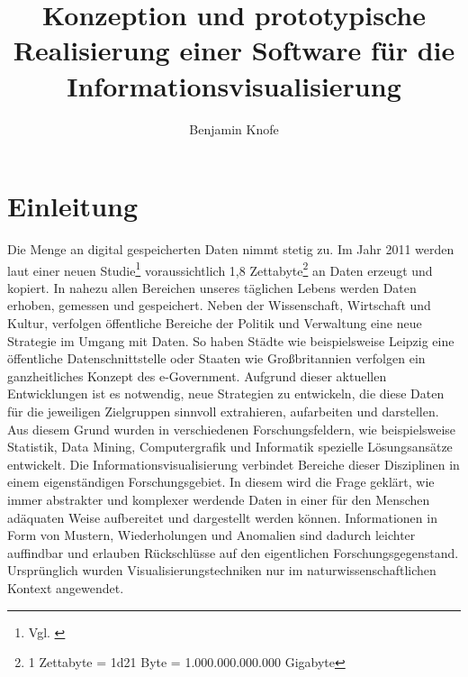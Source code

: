 \documentclass[a4paper, 
               12pt,
               DIV=calc,
               version=first,
               pdftex,
               headsepline,
               footsepline,
               bibtotocnumbered,
               liststotocnumbered]{scrreprt}
\begin{document}
\title{Konzeption und prototypische Realisierung einer Software für die Informationsvisualisierung}
\author{Benjamin Knofe}
\subject{Diplomarbeit}
\publishers{Hochschule für Technik, Wirtschaft und Kultur Leipzig}
\dedication{Danke\\für Kritik, Kommentare, Diskussionen, Code und Hilfe\\
(in alphabetischer Reihenfolge)\\
Christina Sanko, Pyry Jahkola, Ted Mosby, Sarah Walter,
Stephan Keller, Professor Dr.-Ing. Robert Müller, Philip Whitfield, Johannes Knofe, René Zschoch, Moritz Kreutzer, Theresia Becher}
\maketitle
\tableofcontents

\chapter{Einleitung}
\label{cha:Einleitung}
Die Menge an digital gespeicherten Daten nimmt stetig zu. Im Jahr 2011 werden laut einer neuen
Studie\footnote{Vgl. \citep{EMC}} voraussichtlich 1,8 Zettabyte\footnote{1 Zettabyte = \num{1d21}
Byte = 1.000.000.000.000 Gigabyte} an Daten erzeugt und kopiert. In nahezu allen Bereichen unseres
täglichen Lebens werden Daten erhoben, gemessen und gespeichert. Neben der Wissenschaft, Wirtschaft
und Kultur, verfolgen öffentliche Bereiche der Politik und Verwaltung eine neue Strategie im Umgang
mit Daten. So haben Städte wie beispielsweise Leipzig eine öffentliche Datenschnittstelle oder
Staaten wie Großbritannien verfolgen ein ganzheitliches Konzept des e-Government. Aufgrund dieser
aktuellen Entwicklungen ist es notwendig, neue Strategien zu entwickeln, die diese Daten
für die jeweiligen Zielgruppen sinnvoll extrahieren, aufarbeiten und darstellen. Aus diesem
Grund wurden in verschiedenen Forschungsfeldern, wie beispielsweise Statistik, Data Mining,
Computergrafik und Informatik spezielle Lösungsansätze entwickelt.
Die Informationsvisualisierung verbindet Bereiche dieser Disziplinen in einem eigenständigen
Forschungsgebiet.
In diesem wird die Frage geklärt, wie immer abstrakter und komplexer werdende Daten
in einer für den Menschen adäquaten Weise aufbereitet und dargestellt werden können. 
Informationen in Form von Mustern, Wiederholungen und Anomalien sind dadurch leichter auffindbar und erlauben
Rückschlüsse auf den eigentlichen Forschungsgegenstand. Ursprünglich wurden Visualisierungstechniken nur im
naturwissenschaftlichen Kontext angewendet.
\end{document}
